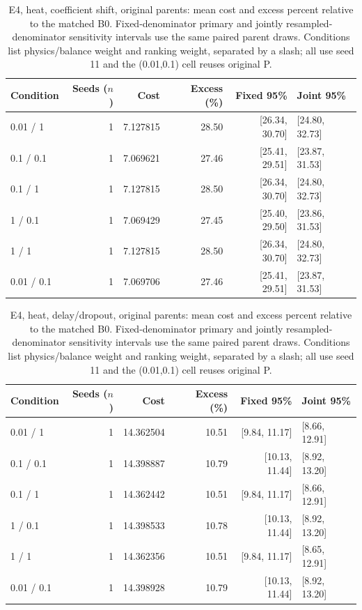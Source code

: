 \begin{table}[ht]
\centering\small
\caption{E4, heat, coefficient shift, original parents: mean cost and excess percent relative to the matched B0. Fixed-denominator primary and jointly resampled-denominator sensitivity intervals use the same paired parent draws. Conditions list physics/balance weight and ranking weight, separated by a slash; all use seed 11 and the (0.01,0.1) cell reuses original P.}\label{tab:revision_cost_E4_heat_locked_coefficient_ood}
\begin{tabular}{@{}lrrrrl@{}}\toprule
Condition & Seeds ($n$) & Cost & Excess (\%) & Fixed 95\% & Joint 95\%\\\midrule
0.01 / 1 & 1 & 7.127815 & 28.50 & [26.34, 30.70] & [24.80, 32.73]\\
0.1 / 0.1 & 1 & 7.069621 & 27.46 & [25.41, 29.51] & [23.87, 31.53]\\
0.1 / 1 & 1 & 7.127815 & 28.50 & [26.34, 30.70] & [24.80, 32.73]\\
1 / 0.1 & 1 & 7.069429 & 27.45 & [25.40, 29.50] & [23.86, 31.53]\\
1 / 1 & 1 & 7.127815 & 28.50 & [26.34, 30.70] & [24.80, 32.73]\\
0.01 / 0.1 & 1 & 7.069706 & 27.46 & [25.41, 29.51] & [23.87, 31.53]\\
\bottomrule\end{tabular}
\end{table}

\begin{table}[ht]
\centering\small
\caption{E4, heat, delay/dropout, original parents: mean cost and excess percent relative to the matched B0. Fixed-denominator primary and jointly resampled-denominator sensitivity intervals use the same paired parent draws. Conditions list physics/balance weight and ranking weight, separated by a slash; all use seed 11 and the (0.01,0.1) cell reuses original P.}\label{tab:revision_cost_E4_heat_locked_delay_dropout}
\begin{tabular}{@{}lrrrrl@{}}\toprule
Condition & Seeds ($n$) & Cost & Excess (\%) & Fixed 95\% & Joint 95\%\\\midrule
0.01 / 1 & 1 & 14.362504 & 10.51 & [9.84, 11.17] & [8.66, 12.91]\\
0.1 / 0.1 & 1 & 14.398887 & 10.79 & [10.13, 11.44] & [8.92, 13.20]\\
0.1 / 1 & 1 & 14.362442 & 10.51 & [9.84, 11.17] & [8.66, 12.91]\\
1 / 0.1 & 1 & 14.398533 & 10.78 & [10.13, 11.44] & [8.92, 13.20]\\
1 / 1 & 1 & 14.362356 & 10.51 & [9.84, 11.17] & [8.65, 12.91]\\
0.01 / 0.1 & 1 & 14.398928 & 10.79 & [10.13, 11.44] & [8.92, 13.20]\\
\bottomrule\end{tabular}
\end{table}

